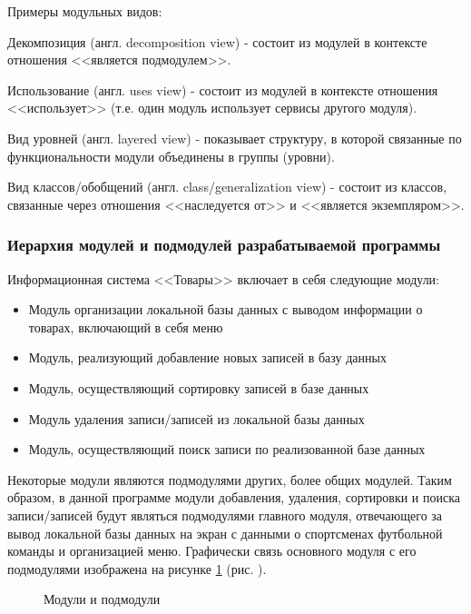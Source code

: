 Примеры модульных видов:

Декомпозиция (англ. decomposition view) - состоит из модулей в контексте отношения <<является подмодулем>>.

Использование (англ. uses view) - состоит из модулей в контексте отношения <<использует>> (т.е. один модуль использует сервисы другого модуля).

Вид уровней (англ. layered view) - показывает структуру, в которой связанные по функциональности модули объединены в группы (уровни).

Вид классов/обобщений (англ. class/generalization view) - состоит из классов, связанные через отношения <<наследуется от>> и <<является экземпляром>>.

\subsubsection*{Иерархия модулей и подмодулей разрабатываемой программы}

Информационная система <<Товары>> включает в себя следующие модули:

\begin{itemize}
    \item Модуль организации локальной базы данных с выводом информации о товарах, включающий в себя меню
    \item Модуль, реализующий добавление новых записей в базу данных
    \item Модуль, осуществляющий сортировку записей в базе данных
    \item Модуль удаления записи/записей из локальной базы данных
    \item Модуль, осуществляющий поиск записи по реализованной базе данных
\end{itemize}

Некоторые модули являются подмодулями других, более общих модулей. Таким образом, в данной программе модули добавления, удаления, сортировки и поиска записи/записей будут являться подмодулями главного модуля, отвечающего за вывод локальной базы данных на экран с данными о спортсменах футбольной команды и организацией меню. Графически связь основного модуля с его подмодулями изображена на рисунке \ref{fig:modules} (рис. \pageref{fig:modules}).

\begin{figure}[!htp]
    \caption{Модули и подмодули}
    \label{fig:modules}
\end{figure}
